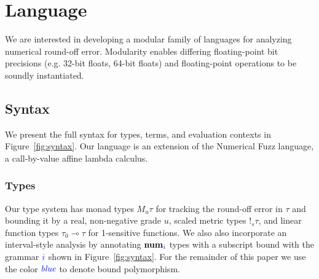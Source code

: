 \section{Language} \label{sec:lang}
We are interested in developing a modular family of languages for analyzing
numerical round-off error. Modularity enables differing floating-point bit
precisions (e.g. 32-bit floats, 64-bit floats) and floating-point operations to
be soundly instantiated.

%
%

\subsection{Syntax}
We present the full syntax for types, terms, and evaluation contexts in
Figure~\ref{fig:syntax}. Our language is an extension of the Numerical Fuzz
\cite{NumFuzz} language, a call-by-value affine lambda calculus.

\subsubsection*{Types}
Our type system has monad types $M_u \tau$ for tracking the round-off error in
$\tau$ and bounding it by a real, non-negative grade $u$, scaled metric types
$!_s \tau$, and linear function types $\tau_0 \multimap \tau$ for 1-sensitive
functions. We also also incorporate an interval-style analysis by annotating
$\textbf{num}_{\textcolor{blue}{i}}$ types with a subscript bound with the grammar $\textcolor{blue}{i}$
shown in Figure~\ref{fig:syntax}. For the remainder of this paper we use the
color $\textcolor{blue}{\textit{blue}}$ to denote bound polymorphism.

